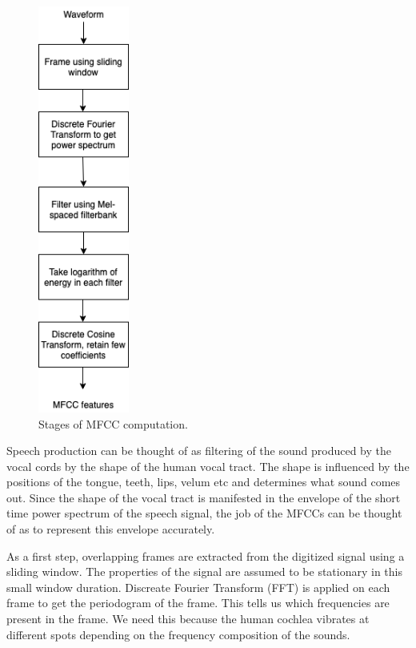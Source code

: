 \begin{figure}[h]
	\includegraphics[width=3cm]{figures/mfcc.png}
	\centering
	\caption{Stages of MFCC computation.}
	\label{fig:fig-mfcc}
\end{figure}

Speech production can be thought of as filtering of the sound produced by the vocal cords by the shape of the human vocal tract. The shape is influenced by the positions of the tongue, teeth, lips, velum etc and determines what sound comes out. Since the shape of the vocal tract is manifested in the envelope of the short time power spectrum of the speech signal, the job of the MFCCs can be thought of as to represent this envelope accurately.

As a first step, overlapping frames are extracted from the digitized signal using a sliding window. The properties of the signal are assumed to be stationary in this small window duration. Discreate Fourier Transform (FFT) is applied on each frame to get the periodogram of the frame. This tells us which frequencies are present in the frame. We need this because the human cochlea vibrates at different spots depending on the frequency composition of the sounds.

